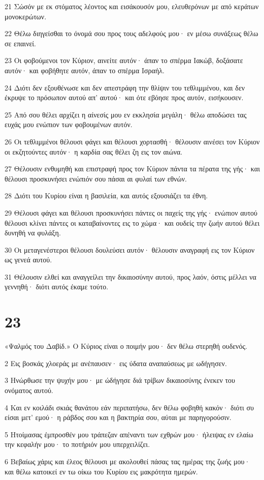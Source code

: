 \par 21 Σώσόν με εκ στόματος λέοντος και εισάκουσόν μου, ελευθερόνων με από κεράτων μονοκερώτων.
\par 22 Θέλω διηγείσθαι το όνομά σου προς τους αδελφούς μου· εν μέσω συνάξεως θέλω σε επαινεί.
\par 23 Οι φοβούμενοι τον Κύριον, αινείτε αυτόν· άπαν το σπέρμα Ιακώβ, δοξάσατε αυτόν· και φοβήθητε αυτόν, άπαν το σπέρμα Ισραήλ.
\par 24 Διότι δεν εξουθένωσε και δεν απεστράφη την θλίψιν του τεθλιμμένου, και δεν έκρυψε το πρόσωπον αυτού απ' αυτού· και ότε εβόησε προς αυτόν, εισήκουσεν.
\par 25 Από σου θέλει αρχίζει η αίνεσίς μου εν εκκλησία μεγάλη· θέλω αποδώσει τας ευχάς μου ενώπιον των φοβουμένων αυτόν.
\par 26 Οι τεθλιμμένοι θέλουσι φάγει και θέλουσι χορτασθή· θέλουσιν αινέσει τον Κύριον οι εκζητούντες αυτόν· η καρδία σας θέλει ζη εις τον αιώνα.
\par 27 Θέλουσιν ενθυμηθή και επιστραφή προς τον Κύριον πάντα τα πέρατα της γής· και θέλουσι προσκυνήσει ενώπιόν σου πάσαι αι φυλαί των εθνών.
\par 28 Διότι του Κυρίου είναι η βασιλεία, και αυτός εξουσιάζει τα έθνη.
\par 29 Θέλουσι φάγει και θέλουσι προσκυνήσει πάντες οι παχείς της γής· ενώπιον αυτού θέλουσι κλίνει πάντες οι καταβαίνοντες εις το χώμα· και ουδείς την ζωήν αυτού θέλει δυνηθή να φυλάξη.
\par 30 Οι μεταγενέστεροι θέλουσι δουλεύσει αυτόν· θέλουσιν αναγραφή εις τον Κύριον ως γενεά αυτού.
\par 31 Θέλουσιν ελθεί και αναγγείλει την δικαιοσύνην αυτού, προς λαόν, όστις μέλλει να γεννηθή· διότι αυτός έκαμε τούτο.

\chapter{23}

\par «Ψαλμός του Δαβίδ.» Ο Κύριος είναι ο ποιμήν μου· δεν θέλω στερηθή ουδενός.
\par 2 Εις βοσκάς χλοεράς με ανέπαυσεν· εις ύδατα αναπαύσεως με ωδήγησεν.
\par 3 Ηνώρθωσε την ψυχήν μου· με ώδήγησε διά τρίβων δικαιοσύνης ένεκεν του ονόματος αυτού.
\par 4 Και εν κοιλάδι σκιάς θανάτου εάν περιπατήσω, δεν θέλω φοβηθή κακόν· διότι συ είσαι μετ' εμού· η ράβδος σου και η βακτηρία σου, αύται με παρηγορούσιν.
\par 5 Ητοίμασας έμπροσθέν μου τράπεζαν απέναντι των εχθρών μου· ήλειψας εν ελαίω την κεφαλήν μου· το ποτήριόν μου υπερχειλίζει.
\par 6 Βεβαίως χάρις και έλεος θέλουσι με ακολουθεί πάσας τας ημέρας της ζωής μου· και θέλω κατοικεί εν τω οίκω του Κυρίου εις μακρότητα ημερών.

